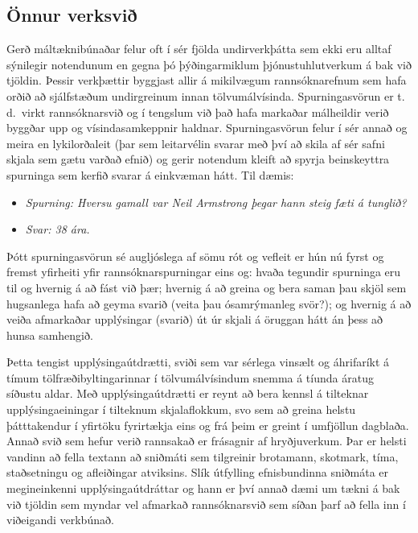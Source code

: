 \documentclass{../../metanetpaper}
\begin{document}
\begin{multicols}{2}
\subsection{Önnur verksvið}

Gerð máltæknibúnaðar felur oft í sér fjölda undirverkþátta sem ekki eru alltaf sýnilegir notendunum en gegna þó þýðingarmiklum þjónustuhlutverkum á bak við tjöldin. Þessir verkþættir byggjast allir á mikilvægum rannsóknarefnum sem hafa orðið að sjálfstæðum undirgreinum innan tölvumálvísinda.
Spurningasvörun er t.\,d.~virkt rannsóknarsvið og í tengslum við það hafa markaðar málheildir verið byggðar upp og vísindasamkeppnir haldnar. Spurningasvörun felur í sér annað og meira en lykilorðaleit (þar sem leitarvélin svarar með því að skila af sér safni skjala sem gætu varðað efnið) og gerir notendum kleift að spyrja beinskeyttra spurninga sem kerfið svarar á einkvæman hátt. Til dæmis:

\begin{itemize}
\item[] \textit{Spurning: Hversu gamall var Neil Armstrong þegar hann steig fæti á tunglið?}
\item[] \textit{Svar: 38 ára.}
\end{itemize}

Þótt spurningasvörun sé augljóslega af sömu rót og vefleit er hún nú fyrst og fremst yfirheiti yfir rannsóknarspurningar eins og: hvaða tegundir spurninga eru til og hvernig á að fást við þær; hvernig á að greina og bera saman þau skjöl sem hugsanlega hafa að geyma svarið (veita þau ósamrýmanleg svör?); og hvernig á að veiða afmarkaðar upplýsingar (svarið) út úr skjali á öruggan hátt án þess að hunsa samhengið.

Þetta tengist upplýsingaútdrætti, sviði sem var sérlega vinsælt og áhrifaríkt á tímum tölfræðibyltingarinnar í tölvumálvísindum snemma á tíunda áratug síðustu aldar. Með upplýsingaútdrætti er reynt að bera kennsl á tilteknar upplýsingaeiningar í tilteknum skjalaflokkum, svo sem að greina helstu þátttakendur í yfirtöku fyrirtækja eins og frá þeim er greint í umfjöllun dagblaða. Annað svið sem hefur verið rannsakað er frásagnir af hryðjuverkum. Þar er helsti vandinn að fella textann að sniðmáti sem tilgreinir brotamann, skotmark, tíma, staðsetningu og afleiðingar atviksins. Slík útfylling efnisbundinna sniðmáta er megineinkenni upplýsingaútdráttar og hann er því annað dæmi um tækni á bak við tjöldin sem myndar vel afmarkað rannsóknarsvið sem síðan þarf að fella inn í viðeigandi verkbúnað. 


\end{multicols}
\end{document}
